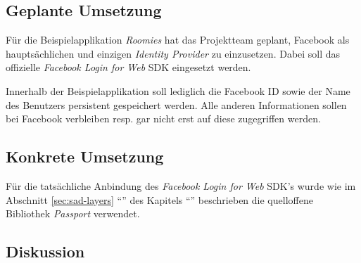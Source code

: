 \subsection*{Geplante Umsetzung}

Für die Beispielapplikation \emph{Roomies} hat das Projektteam geplant, Facebook als hauptsächlichen und einzigen \emph{Identity Provider} zu einzusetzen. Dabei soll das offizielle \emph{Facebook Login for Web} \cite{facebooklogin} \gls{SDK} eingesetzt werden.

Innerhalb der Beispielapplikation soll lediglich die Facebook ID sowie der Name des Benutzers persistent gespeichert werden. Alle anderen Informationen sollen bei Facebook verbleiben resp. gar nicht erst auf diese zugegriffen werden.


\subsection*{Konkrete Umsetzung}

Für die tatsächliche Anbindung des \emph{Facebook Login for Web} \cite{facebooklogin} \gls{SDK}'s wurde wie im Abschnitt \ref{sec:sad-layers} ``'' des Kapitels ``'' beschrieben die quelloffene Bibliothek \emph{Passport} \cite{Passportjs} verwendet.




\subsection*{Diskussion}
